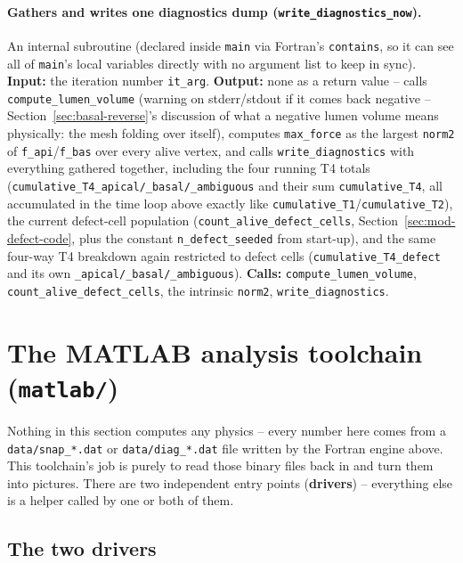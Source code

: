 \documentclass[11pt,a4paper]{report}
\begin{document}
\paragraph{Gathers and writes one diagnostics dump
(\texttt{write\_diagnostics\_now}).} An internal subroutine (declared
inside \texttt{main} via Fortran's \texttt{contains}, so it can see all
of \texttt{main}'s local variables directly with no argument list to
keep in sync). \textbf{Input:} the iteration number
\texttt{it\_arg}. \textbf{Output:} none as a return value -- calls
\texttt{compute\_lumen\_volume} (warning on stderr/stdout if it comes
back negative -- Section~\ref{sec:basal-reverse}'s discussion of what a
negative lumen volume means physically: the mesh folding over itself),
computes \texttt{max\_force} as the largest \texttt{norm2} of
\texttt{f\_api}/\texttt{f\_bas} over every alive vertex, and calls
\texttt{write\_diagnostics} with everything gathered together,
including the four running T4 totals
(\texttt{cumulative\_T4\_apical/\_basal/\_ambiguous} and their sum
\texttt{cumulative\_T4}, all accumulated in the time loop above exactly
like \texttt{cumulative\_T1}/\texttt{cumulative\_T2}), the current
defect-cell population (\texttt{count\_alive\_defect\_cells},
Section~\ref{sec:mod-defect-code}, plus the constant
\texttt{n\_defect\_seeded} from start-up), and the same four-way T4
breakdown again restricted to defect cells
(\texttt{cumulative\_T4\_defect} and its own
\texttt{\_apical/\_basal/\_ambiguous}).
\textbf{Calls:} \texttt{compute\_lumen\_volume},
\texttt{count\_alive\_defect\_cells}, the intrinsic \texttt{norm2},
\texttt{write\_diagnostics}.

\section{The MATLAB analysis toolchain (\texttt{matlab/})}
\label{sec:matlab-code}
Nothing in this section computes any physics -- every number here
comes from a \texttt{data/snap\_*.dat} or \texttt{data/diag\_*.dat}
file written by the Fortran engine above. This toolchain's job is
purely to read those binary files back in and turn them into pictures.
There are two independent entry points (\textbf{drivers}) -- everything
else is a helper called by one or both of them.

\subsection{The two drivers}
\end{document}
